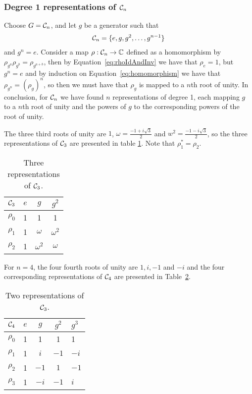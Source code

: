 \subsubsection{Degree 1 representations of $\mathcal{C}_n$}\label{sect:deg1cycn}

Choose $G = \mathcal{C}_n$, and let $g$ be a generator such that 
\begin{align*}
	\mathcal{C}_n = \{ e, g, g^2, \dots, g^{n-1}\}
\end{align*}
and $g^n = e$. Consider a map $\rho: \mathcal{C}_n \rightarrow \mathbb{C}$ defined as a homomorphism by $\rho_{g^a}\rho_{g^b} = \rho_{g^{a+b}}$, then by Equation~\ref{eq:rhoIdAndInv} we have that $\rho_e = 1$, but $g^n = e$ and by induction on Equation~\ref{eq:homomorphism} we have that $\rho_{g^n} = (\rho_g)^n$, so then we must have that $\rho_g$ is mapped to a $n$th root of unity.
In conclusion, for $\mathcal{C}_n$ we have found $n$ representations of degree 1, each mapping $g$ to a $n$th root of unity and the powers of $g$ to the corresponding powers of the root of unity.

\begin{example}
	The three third roots of unity are $1$, $\omega = \frac{-1+i\sqrt{3}}{2}$ and $w^2 = \frac{-1-i\sqrt{3}}{2}$, so the three representations of $\mathcal{C}_3$ are presented in table \ref{table:Cyc3}. Note that $\rho_1^* = \rho_2$.
	
	\begin{table}[hbt!]
		\begin{tabular}{c | c c c}
			$\mathcal{C}_3$ & $e$ & $g$        & $g^2$      \\ \hline
			$\rho_0$          & 1   & 1          & 1          \\
			$\rho_1$          & 1   & $\omega$   & $\omega^2$ \\
			$\rho_2$          & 1   & $\omega^2$ & $\omega$
		\end{tabular}
		\centering
		\caption{Three representations of $\mathcal{C}_3$.}
		\label{table:Cyc3}
	\end{table}
\end{example}

\begin{example}
	For $n = 4$, the four fourth roots of unity are $1,i,-1$ and $-i$ and the four corresponding representations of $\mathcal{C}_4$ are presented in Table~\ref{tbl:cyc4}.
	\begin{table}[hbt!]
		\centering
		\begin{tabular}{c | c c cl}
			$\mathcal{C}_4$ & $e$ & $g$  & $g^2$ & $g^3$ \\ \hline
			$\rho_0$           & 1   & 1    & 1     & 1     \\
			$\rho_1$           & 1   & $i$  & $-1$  & $-i$  \\
			$\rho_2$           & 1   & $-1$ & $1$  & $-1$   \\
			$\rho_3$           & 1   & $-i$ & $-1$   & $i$
		\end{tabular}
		\caption{Two representations of $\mathcal{C}_3$.}
		\label{tbl:cyc4}
	\end{table}
\end{example}
	

